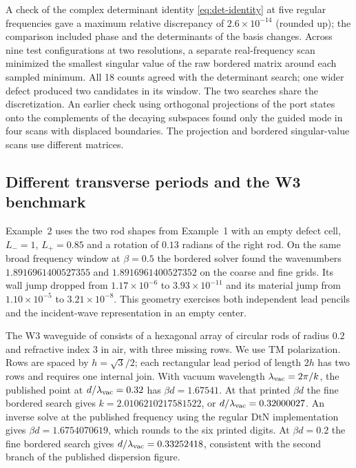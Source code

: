A check of the complex determinant identity \eqref{eq:det-identity}
at five regular frequencies gave a maximum relative discrepancy of
$2.6\times10^{-14}$ (rounded up); the comparison included phase and
the determinants of the basis changes. Across nine test configurations
at two resolutions, a separate real-frequency scan minimized the smallest
singular value of the raw bordered matrix around each sampled minimum.
All 18 counts agreed with the determinant search; one wider defect
produced two candidates in its window. The two searches share the
discretization. An earlier check using orthogonal projections of the
port states onto the complements of the decaying subspaces found only
the guided mode in four scans with displaced boundaries. The projection
and bordered singular-value scans use different matrices.


\subsection{Different transverse periods and the W3 benchmark}\label{sec:litbench}
Example~2 uses the two rod shapes from Example~1 with an empty defect
cell, $L_-=1$, $L_+=0.85$ and a rotation of $0.13$ radians of the
right rod. On the same broad frequency window at $\beta=0.5$ the bordered
solver found the wavenumbers $1.8916961400527355$ and $1.8916961400527352$
on the coarse and fine grids. Its wall jump dropped from
$1.17\times10^{-6}$ to $3.93\times10^{-11}$ and its material jump from
$1.10\times10^{-5}$ to $3.21\times10^{-8}$. This geometry exercises both
independent lead pencils and the incident-wave representation in an
empty center.

The W3 waveguide of \cite{BottenEtAl2006} consists of a hexagonal array
of circular rods of radius $0.2$ and refractive index $3$ in air, with
three missing rows. We use TM polarization. Rows are spaced by
$h=\sqrt{3}/2$; each rectangular lead period of length $2h$ has two
rows and requires one internal join. With vacuum wavelength
$\lambda_{\rm vac}=2\pi/k$, the published point at $d/\lambda_{\rm vac}=0.32$
has $\beta d=1.67541$. At that printed $\beta d$ the fine bordered search
gives $k=2.0106210217581522$, or $d/\lambda_{\rm vac}=0.32000027$.
An inverse solve at the published frequency using the regular DtN
implementation gives $\beta d=1.6754070619$, which rounds to the six
printed digits. At $\beta d=0.2$ the fine bordered search gives
$d/\lambda_{\rm vac}=0.33252418$, consistent with the second branch of
the published dispersion figure.

